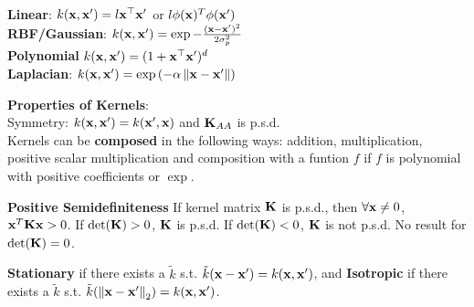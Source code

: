 \begin{framed}
    \textbf{Linear}: $k(\mathbf{x}, \mathbf{x'}) = l \mathbf{x}^\top \mathbf{x'}$ or \(l\phi(\mathbf{x})^T \phi(\mathbf{x}')\)\\
    \textbf{RBF/Gaussian}: $k(\mathbf{x}, \mathbf{x'}) = \exp{-\frac{(\mathbf{x}- \mathbf{x'})^2}{2\sigma_p^2}}$ \\
    \textbf{Polynomial} $k(\mathbf{x}, \mathbf{x'}) = (1 + \mathbf{x}^\top \mathbf{x'})^d$ \\
    \textbf{Laplacian}: $k(\vx, \vxp) = \exp{\left(-\alpha \norm{\vx - \vxp}\right)}$
\end{framed}
\begin{framed}
    \textbf{Properties of Kernels}:  \\
    Symmetry: $k(\mathbf{x}, \mathbf{x'}) = k(\mathbf{x'}, \mathbf{x})$ and $\mathbf{K}_{AA}$ is p.s.d. \\
    Kernels can be \textbf{composed} in the following ways: addition, multiplication, positive scalar multiplication and composition with a funtion $f$ if $f$ is polynomial with positive coefficients or $\exp$.
\end{framed}
\begin{framed}
    \textbf{Positive Semidefiniteness}
    If kernel matrix \(\mathbf{K}\) is p.s.d., then  \(\forall \mathbf{x}\neq 0\), \(\mathbf{x}^T \mathbf{K} \mathbf{x} >0\).
    If \(\det{\mK}>0\),  \(\mathbf{K}\) is p.s.d. If \(\det{\mK}<0\),  \(\mathbf{K}\) is not p.s.d. No result for \(\det{\mK}=0\).

    
\end{framed}
\textbf{Stationary} if there exists a $\tilde{k}$ s.t. $\tilde{k}(\mathbf{x} - \mathbf{x'}) = k(\mathbf{x}, \mathbf{x'})$, and \textbf{Isotropic} if there exists a $\tilde{k}$ s.t. $\tilde{k}(\norm{\vx-\vxp}_2) = k(\vx, \vxp)$.

